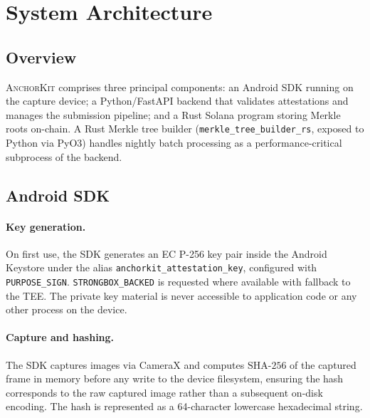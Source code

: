 \documentclass[11pt,a4paper]{article}
\newcommand{\SHA}{\text{SHA-256}}
\newcommand{\AK}{\textsc{AnchorKit}\xspace}
\begin{document}
\section{System Architecture}
\label{sec:architecture}

\subsection{Overview}

\AK comprises three principal components: an Android SDK running on the capture
device; a Python/FastAPI backend that validates attestations and manages the
submission pipeline; and a Rust Solana program storing Merkle roots on-chain.
A Rust Merkle tree builder (\texttt{merkle\_tree\_builder\_rs}, exposed to
Python via PyO3) handles nightly batch processing as a performance-critical
subprocess of the backend.

\subsection{Android SDK}
\label{sec:sdk}

\paragraph{Key generation.} On first use, the SDK generates an EC P-256 key
pair inside the Android Keystore under the alias
\texttt{anchorkit\_attestation\_key}, configured with
\texttt{PURPOSE\_SIGN}.  \texttt{STRONGBOX\_BACKED} is requested where
available with fallback to the TEE\@.  The private key material is never
accessible to application code or any other process on the device.

\paragraph{Capture and hashing.} The SDK captures images via CameraX and
computes $\SHA$ of the captured frame in memory before any write to the device
filesystem, ensuring the hash corresponds to the raw captured image rather than
a subsequent on-disk encoding.  The hash is represented as a 64-character
lowercase hexadecimal string.
\end{document}
